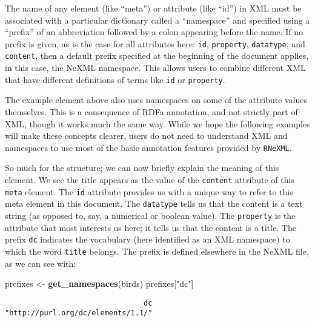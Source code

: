 \documentclass[author-year, review, 11pt]{components/elsarticle} %
\newenvironment{Shaded}{\begin{snugshade}}{\end{snugshade}}
\newcommand{\KeywordTok}[1]{\textcolor[rgb]{0.13,0.29,0.53}{\textbf{{#1}}}}
\newcommand{\StringTok}[1]{\textcolor[rgb]{0.31,0.60,0.02}{{#1}}}
\newcommand{\NormalTok}[1]{{#1}}
\begin{document}
The name of any element (like ``meta'') or attribute (like ``id'') in
XML must be associated with a particular dictionary called a
``namespace'' and specified using a ``prefix'' of an abbreviation
followed by a colon appearing before the name. If no prefix is given, as
is the case for all attributes here: \texttt{id}, \texttt{property},
\texttt{datatype}, and \texttt{content}, then a default prefix specified
at the beginning of the document applies, in this case, the NeXML
namespace. This allows users to combine different XML that have
different definitions of terms like \texttt{id} or \texttt{property}.

The example element above also uses namespaces on some of the attribute
values themselves. This is a consequence of RDFa annotation, and not
strictly part of XML, though it works much the same way. While we hope
the following examples will make these concepts clearer, users do not
need to understand XML and namespaces to use most of the basic
annotation features provided by \texttt{RNeXML}.

So much for the structure; we can now briefly explain the meaning of
this element. We see the title appears as the value of the
\texttt{content} attribute of this \texttt{meta} element. The
\texttt{id} attribute provides us with a unique way to refer to this
meta element in this document. The \texttt{datatype} tells us that the
content is a text string (as opposed to, say, a numerical or boolean
value). The \texttt{property} is the attribute that most interests us
here; it tells us that the content is a title. The prefix \texttt{dc}
indicates the vocabulary (here identified as an XML namespace) to which
the word \texttt{title} belongs. The prefix is defined elsewhere in the
NeXML file, as we can see with:

\begin{Shaded}
\begin{Highlighting}[]
\NormalTok{prefixes <-}\StringTok{ }\KeywordTok{get_namespaces}\NormalTok{(birds)}
\NormalTok{prefixes[}\StringTok{"dc"}\NormalTok{]}
\end{Highlighting}
\end{Shaded}

\begin{verbatim}
                                dc 
"http://purl.org/dc/elements/1.1/" 
\end{verbatim}
\end{document}
